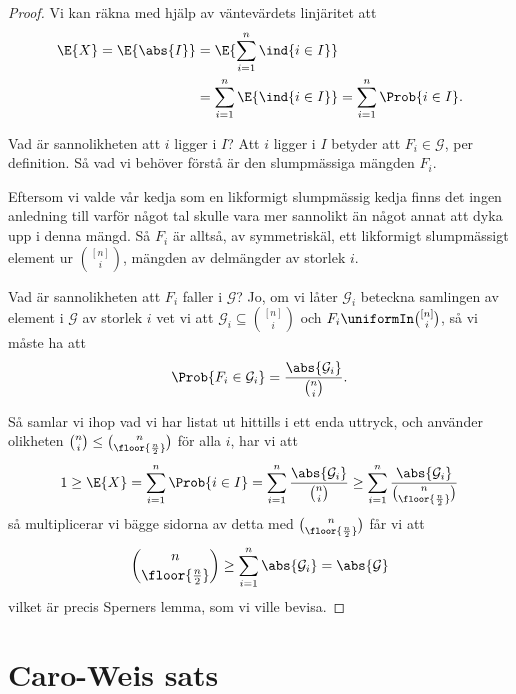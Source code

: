 \documentclass[nobib]{tufte-handout}
\begin{document}
\begin{lemma}
\begin{proof}
        Vi kan räkna med hjälp av väntevärdets linjäritet att
        \begin{align*}
            \E{X} = \E{\abs{I}} &= \E{\sum_{i=1}^{n} \ind{i \in I}}\\
            &= \sum_{i=1}^{n} \E{\ind{i \in I}} = \sum_{i=1}^{n} \Prob{i \in I}.
        \end{align*}

        Vad är sannolikheten att $i$ ligger i $I$? Att $i$ ligger i $I$ betyder att $F_i \in \mathcal{G}$, per definition. Så vad vi behöver förstå är den slumpmässiga mängden $F_i$.

        Eftersom vi valde vår kedja som en likformigt slumpmässig kedja finns det ingen anledning till varför något tal skulle vara mer sannolikt än något annat att dyka upp i denna mängd. Så $F_i$ är alltså, av symmetriskäl, ett likformigt slumpmässigt element ur $\binom{[n]}{i}$, mängden av delmängder av storlek $i$.

        Vad är sannolikheten att $F_i$ faller i $\mathcal{G}$? Jo, om vi låter $\mathcal{G}_i$ beteckna samlingen av element i $\mathcal{G}$ av storlek $i$ vet vi att $\mathcal{G}_i \subseteq \binom{[n]}{i}$  och $F_i \uniformIn \binom{[n]}{i}$, så vi måste ha att
        $$\Prob{F_i \in \mathcal{G}_i} = \frac{\abs{\mathcal{G}_i}}{\binom{n}{i}}.$$

        Så samlar vi ihop vad vi har listat ut hittills i ett enda uttryck, och använder olikheten $\binom{n}{i} \leq \binom{n}{\floor{\frac{n}{2}}}$ för alla $i$, har vi att
        $$1 \geq \E{X} = \sum_{i=1}^{n} \Prob{i \in I} = \sum_{i=1}^{n} \frac{\abs{\mathcal{G}_i}}{\binom{n}{i}} \geq \sum_{i=1}^{n} \frac{\abs{\mathcal{G}_i}}{\binom{n}{\floor{\frac{n}{2}}}}$$
        så multiplicerar vi bägge sidorna av detta med $\binom{n}{\floor{\frac{n}{2}}}$ får vi att
        $$\binom{n}{\floor{\frac{n}{2}}} \geq \sum_{i=1}^{n} \abs{\mathcal{G}_i} = \abs{\mathcal{G}}$$
        vilket är precis Sperners lemma, som vi ville bevisa.
    \end{proof}
\end{lemma}

\section{Caro-Weis sats}
\end{document}
